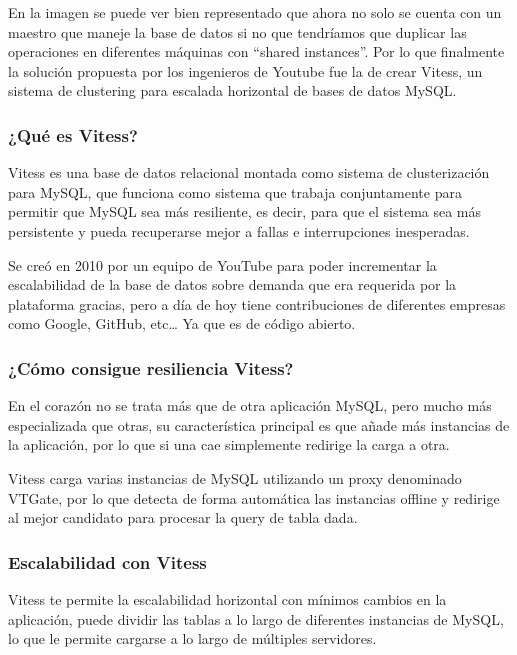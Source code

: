 \documentclass[12pt,a4paper]{article}
\begin{document}
    En la imagen se puede ver bien representado que ahora no solo se cuenta con un maestro que maneje la base de datos si no que tendríamos que duplicar las operaciones en diferentes máquinas con “shared instances”. Por lo que finalmente la solución propuesta por los ingenieros de Youtube fue la de crear Vitess, un sistema de clustering para escalada horizontal de bases de datos MySQL.

    \subsubsection{¿Qué es Vitess?}

    Vitess es una base de datos relacional montada como sistema de clusterización para MySQL, que funciona como sistema que trabaja conjuntamente para permitir que MySQL sea más resiliente, es decir, para que el sistema sea más persistente y pueda recuperarse mejor a fallas e interrupciones inesperadas.

    Se creó en 2010 por un equipo de YouTube para poder incrementar la escalabilidad de la base de datos sobre demanda que era requerida por la plataforma gracias, pero a día de hoy tiene contribuciones de diferentes empresas como Google, GitHub, etc… Ya que es de código abierto. 

    \subsubsection{¿Cómo consigue resiliencia Vitess?}

    En el corazón no se trata más que de otra aplicación MySQL, pero mucho más especializada que otras, su característica principal es que añade más instancias de la aplicación, por lo que si una cae simplemente redirige la carga a otra. 

    Vitess carga varias instancias de MySQL utilizando un proxy denominado VTGate, por lo que detecta de forma automática las instancias offline y redirige al mejor candidato para procesar la query de tabla dada. 

    \subsubsection{Escalabilidad con Vitess}

    Vitess te permite la escalabilidad horizontal con mínimos cambios en la aplicación, puede dividir las tablas a lo largo de diferentes instancias de MySQL, lo que le permite cargarse a lo largo de múltiples servidores.
\end{document}
